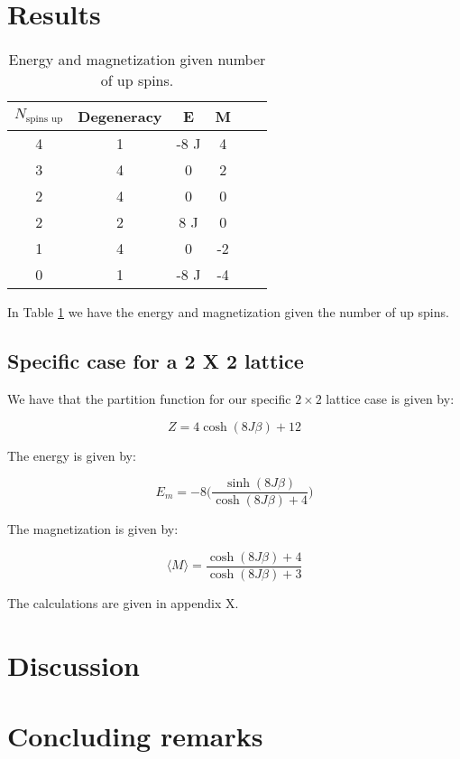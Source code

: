 \documentclass{article}
\begin{document}
\begin{multicols}{2}
\section{Results}

\begin{table}[H]
\begin{center}
\caption{Energy and magnetization given number of up spins.}
\begin{tabular}{  |c|c|c|c|c|c| } \hline
$N_{\text{spins up}}$&Degeneracy&E&M \\ \hline
4&1&-8 J&4\\ \hline
3&4&0 &2 \\ \hline
2&4&0&0\\ \hline
2&2&8 J&0\\ \hline
1&4&0&-2\\ \hline
0&1&-8 J&-4\\ \hline
\end{tabular}
\label{tab:up_spins}
\end{center}
\end{table}

In Table \ref{tab:up_spins} we have the energy and magnetization given the number of up spins. 

\subsection*{Specific case for a 2 X 2 lattice}

We have that the partition function for our specific $2\times2$ lattice case is given by:

\begin{equation}
Z=4\cosh{(8J\beta)}+12
\label{eq:Z_22}
\end{equation}

The energy is given by:

\begin{equation}
E_m=-8\bigg(\frac{\sinh{(8J\beta)}}{\cosh{(8J\beta)}+4}\bigg)
\label{eq:E_22}
\end{equation}

The magnetization is given by:

\begin{equation}
\langle M \rangle=\frac{\cosh{(8J\beta)}+4} {\cosh{(8J\beta)}+3}
\label{eq:M_22}
\end{equation}

The calculations are given in appendix X.

\section{Discussion}

\section{Concluding remarks}

\end{multicols}
\end{document}
